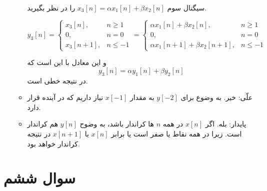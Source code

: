 \documentclass[12pt]{article}
\begin{document}
\begin{enumerate}[label = \harfi*)]
\begin{itemize}
	سیگنال سوم
	$x_3[n] = \alpha x_1[n] + \beta x_2[n]$
	را در نظر بگیرید.
	
	
		$$
	y_3[n]=\left\{\begin{array}{lc}
		x_3[n], & n \geq 1 \\
		0, & n=0 \\
		x_3[n+1], & n \leq-1
	\end{array}\right. = 
\left\{\begin{array}{lc}
 \alpha x_1[n] + \beta x_2[n], & n \geq 1 \\
	0, & n=0 \\
	 \alpha x_1[n+1] + \beta x_2[n+1], & n \leq-1
\end{array}\right.
	$$
	
	و این معادل با این است که
	$$y_3[n] = \alpha y_1[n] + \beta y_2[n]$$
	در نتیجه خطی است.
	
	\item
	علّی: خیر. به وضوع برای $y[-2]$ به مقدار $x[-1]$ نیاز داریم که در آینده قرار دارد.
	\item
	پایدار: بله. اگر
	 $x[n]$
	 در همه $n$ ها کراندار باشد، به وضوح
	 $y[n]$
	 هم کراندار است. زیرا در همه نقاط یا صفر است یا برابر
	 $x[n]$
	 یا
	 $x[n+1]$
	 در نتیجه کراندار خواهد بود.
	 
\end{itemize}

	
\end{enumerate}

\newpage

\section{سوال ششم}
\end{document}
